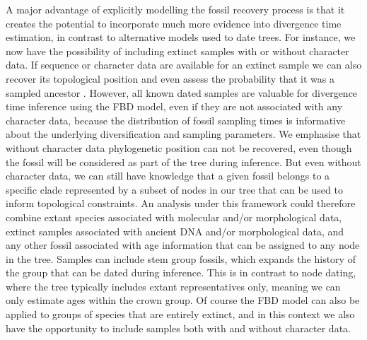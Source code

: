 \documentclass[11pt]{article}
\begin{document}
A major advantage of explicitly modelling the fossil recovery process is that it creates the potential to incorporate much more evidence into divergence time estimation, in contrast to alternative models used to date trees.
For instance, we now have the possibility of including extinct samples with or without character data.
If sequence or character data are available for an extinct sample we can also recover its topological position \cite{Zhang2016} and even assess the probability that it was a sampled ancestor \cite{Gavryushkina2016}.
However, all known dated samples are valuable for divergence time inference using the FBD model, even if they are not associated with any character data, because the distribution of fossil sampling times is informative about the underlying diversification and sampling parameters.
We emphasise that without character data phylogenetic position can not be recovered, even though the fossil will be considered as part of the tree during inference.
But even without character data, we can still have knowledge that a given fossil belongs to a specific clade represented by a subset of nodes in our tree that can be used to inform topological constraints. %
An analysis under this framework could therefore combine extant species associated with molecular and/or morphological data, extinct samples associated with ancient DNA and/or morphological data, and any other fossil associated with age information that can be assigned to any node in the tree. 
Samples can include stem group fossils, which expands the history of the group that can be dated during inference.
This is in contrast to node dating, where the tree typically includes extant representatives only, meaning we can only  estimate ages within the crown group. 
Of course the FBD model can also be applied to groups of species that are entirely extinct, and in this context we also have the opportunity to include samples both with and without character data.
\end{document}

